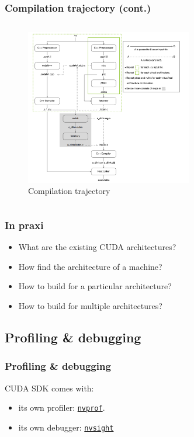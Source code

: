 \begin{frame}
   \frametitle{Compilation trajectory (cont.)}
      \begin{columns}
           \begin{figure}[H]
              \centering
              \includegraphics[width=0.65\textwidth]{./img/compileTrajectory.png}
	      \caption{\small{Compilation trajectory}}
           \end{figure}
        \end{columns}
\end{frame}     



\begin{frame}
   \frametitle{In praxi}
      \begin{itemize}  	
         \item What are the existing CUDA architectures?
         \item How find the architecture of a machine?
         \item How to build for a particular architecture?
         \item How to build for multiple architectures?		 
      \end{itemize} 
\end{frame}


\subsection{Profiling \& debugging}
\begin{frame}
   \frametitle{Profiling \& debugging} 
      CUDA SDK comes with:
      \begin{itemize}	
         \item its own profiler: \href{https://docs.nvidia.com/cuda/profiler-users-guide/}{\texttt{nvprof}}.  
	 \item its own debugger: \href{https://docs.nvidia.com/nsight-visual-studio-edition/cuda-debugger/}{\texttt{nvsight}}
      \end{itemize}		 
\end{frame}


